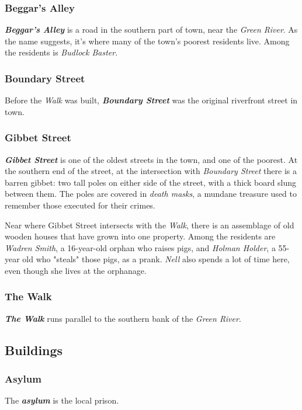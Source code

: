 \documentclass[11pt]{teraum_adventure}
\begin{document}
\subsubsection*{Beggar's Alley}
\label{sec:orga32863a}
\textbf{\emph{Beggar's Alley}} is a road in the southern part of town, near the
\emph{Green River}. As the name suggests, it's where many of the town's
poorest residents live. Among the residents is \emph{Budlock Baster}.
\subsubsection*{Boundary Street}
\label{sec:orgd9b4c77}
Before the \emph{Walk} was built, \textbf{\emph{Boundary Street}} was the original
riverfront street in town.
\subsubsection*{Gibbet Street}
\label{sec:orgfe16cc8}
\textbf{\emph{Gibbet Street}} is one of the oldest streets in the town, and one of
the poorest. At the southern end of the street, at the intersection
with \emph{Boundary Street} there is a barren gibbet: two tall poles on
either side of the street, with a thick board slung between them. The
poles are covered in \emph{death masks}, a mundane treasure used to remember
those executed for their crimes.

Near where Gibbet Street intersects with the \emph{Walk}, there is an
assemblage of old wooden houses that have grown into one property.
Among the residents are \emph{Wadren Smith}, a 16-year-old orphan who raises pigs,
and \emph{Holman Holder}, a 55-year old who "steals" those pigs, as a prank.
\emph{Nell} also spends a lot of time here, even though she lives at the
orphanage.
\subsubsection*{The Walk}
\label{sec:org9bc35b4}
\textbf{\emph{The Walk}} runs parallel to the southern bank of the \emph{Green River}.
\subsection*{Buildings}
\label{sec:orge5e8f39}
\subsubsection*{Asylum}
\label{sec:org1386f83}
The \textbf{\emph{asylum}} is the local prison.
\end{document}
